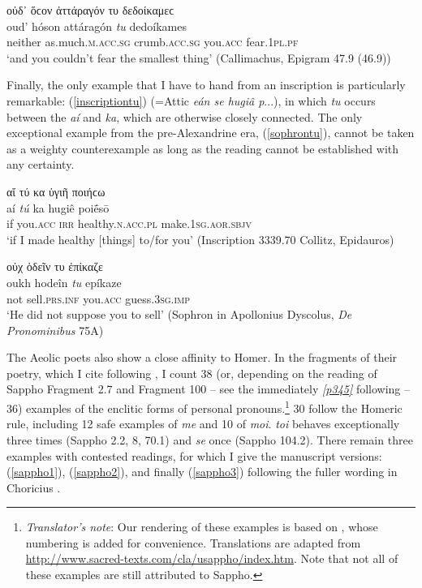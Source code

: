 \begin{exe}
\ex οὐδ᾽ ὅϲον ἀττάραγόν {τυ} δεδοίκαμεϲ\\
\gll oud' hóson attáragón \emph{tu} dedoíkames\\
neither as.much.\textsc{m.acc.sg} crumb.\textsc{acc.sg} you.\textsc{acc} fear.\textsc{1pl.pf}\\
\trans `and you couldn't fear the smallest thing' (Callimachus, Epigram 47.9 (46.9))
\label{callimachus}
\end{exe}

Finally, the only example that I have to hand from an inscription is particularly remarkable: (\ref{inscriptiontu}) (=Attic \emph{eán se hugiâ p}...), in which \textit{tu} occurs between the  \textit{aí} and \textit{ka}, which are otherwise closely connected. The only exceptional example from the pre-Alexandrine era, (\ref{sophrontu}), cannot be taken as a weighty counterexample as long as the reading cannot be established with any certainty.

\begin{exe}
\ex αἴ {τύ} κα ὑγιῆ ποιήϲω\\
\gll aí \emph{tú} ka hugiê poiḗsō\\
if you.\textsc{acc} \textsc{irr} healthy.\textsc{n.acc.pl} make.\textsc{1sg.aor.sbjv}\\
\trans `if I made healthy {[}things{]} to/for you' (Inscription 3339.70 Collitz, Epidauros)
\label{inscriptiontu}
\end{exe}

\begin{exe}
\ex οὐχ ὁδεῖν {τυ} ἐπίκαζε\\
\gll oukh hodeîn \emph{tu} epíkaze\\
not sell.\textsc{prs.inf} you.\textsc{acc} guess.\textsc{3sg.imp}\\
\trans `He did not suppose you to sell' (Sophron in Apollonius Dyscolus, \textit{De Pronominibus} 75A)
\label{sophrontu}
\end{exe}

The Aeolic poets also show a close affinity to Homer. In the fragments of their poetry, which I cite following \citet{Bergk1882}, I count 38 (or, depending on the reading of Sappho Fragment 2.7 and Fragment 100 -- see the immediately \hyperlink{p345}{\emph{[p345]}} following -- 36) examples of the enclitic forms of personal pronouns.\footnote{\emph{Translator's note}: Our rendering of these examples is based on \citet{LobelPage1968}, whose numbering is added for convenience. Translations are adapted from \url{http://www.sacred-texts.com/cla/usappho/index.htm}. Note that not all of these examples are still attributed to Sappho.} 30 follow the Homeric rule, including 12 safe examples of \textit{me} and 10 of \textit{moi}. \textit{toi} behaves exceptionally three times (Sappho 2.2, 8, 70.1) and \textit{se} once (Sappho 104.2). There remain three examples with contested readings, for which I give the manuscript versions: (\ref{sappho1}), (\ref{sappho2}), and finally (\ref{sappho3}) following the fuller wording in Choricius \citep[97]{Graux1886}. 

